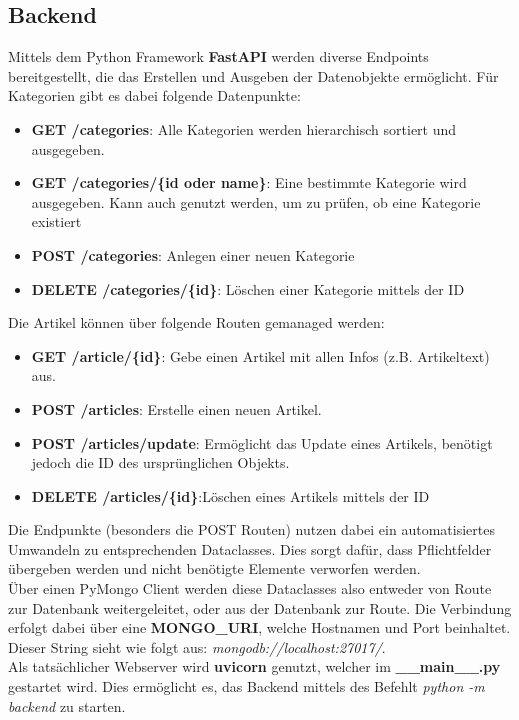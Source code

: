 \subsection{Backend}
Mittels dem Python Framework \textbf{FastAPI} werden diverse Endpoints bereitgestellt, die das Erstellen und Ausgeben der Datenobjekte ermöglicht.
Für Kategorien gibt es dabei folgende Datenpunkte:
\begin{itemize}
\item \textbf{GET /categories}: Alle Kategorien werden hierarchisch sortiert und ausgegeben.
\item \textbf{GET /categories/\{id oder name\}}: Eine bestimmte Kategorie wird ausgegeben. Kann auch genutzt werden, um zu prüfen, ob eine Kategorie existiert 
\item \textbf{POST /categories}: Anlegen einer neuen Kategorie
\item \textbf{DELETE /categories/\{id\}}: Löschen einer Kategorie mittels der ID
\end{itemize}


Die Artikel können über folgende Routen gemanaged werden:
\begin{itemize}
\item \textbf{GET /article/\{id\}}: Gebe einen Artikel mit allen Infos (z.B. Artikeltext) aus.
\item \textbf{POST /articles}: Erstelle einen neuen Artikel.
\item \textbf{POST /articles/update}: Ermöglicht das Update eines Artikels, benötigt jedoch die ID des ursprünglichen Objekts.
\item \textbf{DELETE /articles/\{id\}}:Löschen eines Artikels mittels der ID
\end{itemize}

Die Endpunkte (besonders die POST Routen) nutzen dabei ein automatisiertes Umwandeln zu entsprechenden Dataclasses.
Dies sorgt dafür, dass Pflichtfelder übergeben werden und nicht benötigte Elemente verworfen werden.\\
Über einen PyMongo Client werden diese Dataclasses also entweder von Route zur Datenbank weitergeleitet, oder aus der Datenbank zur Route.
Die Verbindung erfolgt dabei über eine \textbf{MONGO\_URI}, welche Hostnamen und Port beinhaltet. Dieser String sieht wie folgt aus: \textit{mongodb://localhost:27017/}. \\
Als tatsächlicher Webserver wird \textbf{uvicorn} genutzt, welcher im \textbf{\_\_main\_\_.py} gestartet wird. Dies ermöglicht es, das Backend mittels des Befehlt \textit{python -m backend} zu starten.

